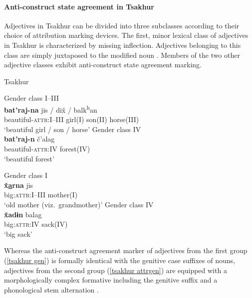 \paragraph*{Anti\hyp{}construct state agreement in Tsakhur}
Adjectives in Tsakhur can be divided into three subclasses according to their choice of attribution marking devices. The first, minor lexical class of adjectives in Tsakhur is characterized by missing inflection. Adjectives belonging to this class are simply juxtaposed to the modified noun \citep[383]{talibov2004}. Members of the two other adjective classes exhibit anti\hyp{}construct state agreement marking.
\begin{exe}
\ex 
\rm{Tsakhur \citep[382]{talibov2004}}
\begin{xlist}
\ex	
\label{tsakhur gen}
\begin{xlist}
\ex \rm{Gender class I–III}\\
\gll	\textbf{bat'raj-na} jis / dix̌ / balk\textsuperscript{h}an\\
	 beautiful-\textsc{attr:I–III} girl(\textsc{I}) { } son(\textsc{II}) { } horse(\textsc{III})\\
\glt	 ‘beautiful girl / son / horse’
\ex \rm{Gender class IV}\\
\gll	\textbf{bat'raj-n}	č'alag\\
	beautiful-\textsc{attr:IV} forest(\textsc{IV})\\
\glt	‘beautiful forest’
\end{xlist}
\ex 
\label{tsakhur attrgen}
\begin{xlist}
\ex \rm{Gender class I}\\
\gll	\textbf{x̌\underline{a}rna} jis\\
	big:\textsc{attr:I–III} mother(\textsc{I})\\
\glt	‘old mother (viz.~grandmother)’
\ex \rm{Gender class IV}\\
\gll	\textbf{x̌adɨn} balag\\
	big:\textsc{attr:IV} sack(\textsc{IV})\\
\glt	‘big sack’
\end{xlist}
\end{xlist}
\end{exe}
Whereas the anti\hyp{}construct agreement marker of adjectives from the first group (\ref{tsakhur gen}) is formally identical with the genitive case suffixes of nouns, adjectives from the second group (\ref{tsakhur attrgen}) are equipped with a morphologically complex formative including the genitive suffix and a phonological stem alternation \citep[382]{talibov2004}.

